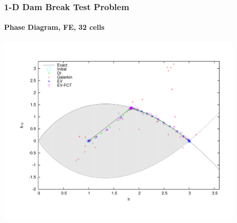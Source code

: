 \begin{frame}
\frametitle{1-D Dam Break Test Problem}
\framesubtitle{Phase Diagram, FE, 32 cells}

\begin{center}
   \includegraphics[width=0.9\textwidth]
     {figures/phase_all_FE_32cells.pdf}
\end{center}

\end{frame}
